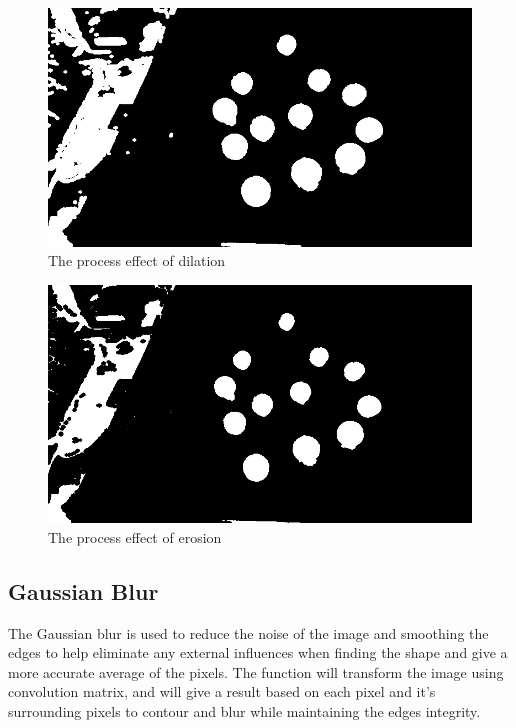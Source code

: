 \documentclass[a4paper, 10pt]{article}
\begin{document}
\begin{figure}[H]
  \includegraphics[width=\linewidth/2]{images/Dilation}
  \caption{The process effect of dilation}
  \label{fig:The process effect of dilation}
\end{figure}

\begin{figure}[H]
  \includegraphics[width=\linewidth/2]{images/Erosion}
  \caption{The process effect of erosion}
  \label{fig:The process effect of erosion}
\end{figure}

\clearpage
\subsection{Gaussian Blur}

The Gaussian blur is used to reduce the noise of the image and smoothing the edges to help eliminate any external influences when finding the shape and give a more accurate average of the pixels. The function will transform the image using convolution matrix, and will give a result based on each pixel and it's surrounding pixels to contour and blur while maintaining the edges integrity.
\end{document}
